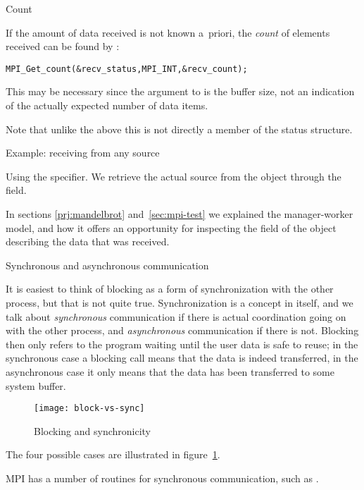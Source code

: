  {Count}

If the amount of data received is not known a~priori, the
\emph{count} of elements received
can be found by 
:

\begin{lstlisting}
MPI_Get_count(&recv_status,MPI_INT,&recv_count);
\end{lstlisting}
This may be necessary since the  argument to  is 
the buffer size, not an indication of the actually expected number of
data items.

Note that unlike the above this is not directly a member of the status
structure.

 {Example: receiving from any source}

Using the  specifier. We retrieve the
actual source from the  object through the
 field.
%
%

In sections \ref{prj:mandelbrot} and~\ref{sec:mpi-test} we explained
the manager-worker model, and how it offers an opportunity for inspecting the
 field of the 
object describing the data that was received.

 {Synchronous and asynchronous communication}


It is easiest to think of blocking as a form of synchronization with
the other process, but that is not quite true. Synchronization is a
concept in itself, and we talk about \emph{synchronous} communication
if there is actual coordination going on with the other process,
and \emph{asynchronous} communication if there is not. Blocking then
only refers to the program waiting until the user data is safe
to reuse; in the synchronous case a blocking call means that the data
is indeed transferred, in the asynchronous case it only means that the
data has been transferred to some system buffer.
%
\begin{figure}[ht]
\texttt{[image: block-vs-sync]}
\caption{Blocking and synchronicity}
\label{fig:block-sync}
\end{figure}
The four possible cases are illustrated in figure~\ref{fig:block-sync}.

MPI has a number of routines for synchronous communication,
such as .

